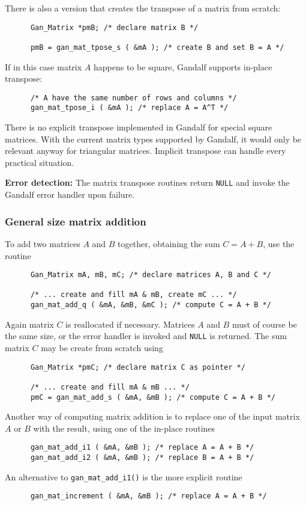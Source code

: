 There is also a version that creates the transpose of a matrix from scratch:
\begin{verbatim}
      Gan_Matrix *pmB; /* declare matrix B */

      pmB = gan_mat_tpose_s ( &mA ); /* create B and set B = A */
\end{verbatim}
If in this case matrix $A$ happens to be square, Gandalf supports in-place
transpose:
\begin{verbatim}
      /* A have the same number of rows and columns */
      gan_mat_tpose_i ( &mA ); /* replace A = A^T */
\end{verbatim}

There is no explicit transpose implemented in Gandalf for special square
matrices. With the current matrix types supported by Gandalf, it would only
be relevant anyway for triangular matrices. Implicit transpose can handle
every practical situation.

{\bf Error detection:} The matrix transpose routines return {\tt NULL} and
invoke the Gandalf error handler upon failure.

\subsubsection{General size matrix addition}
To add two matrices $A$ and $B$ together, obtaining the sum
$C = A + B$, use the routine
\begin{verbatim}
      Gan_Matrix mA, mB, mC; /* declare matrices A, B and C */

      /* ... create and fill mA & mB, create mC ... */
      gan_mat_add_q ( &mA, &mB, &mC ); /* compute C = A + B */
\end{verbatim}
Again matrix $C$ is reallocated if necessary. Matrices $A$ and
$B$ must of course be the same size, or the error handler is invoked
and {\tt NULL} is returned. The sum matrix $C$ may be create from scratch
using
\begin{verbatim}
      Gan_Matrix *pmC; /* declare matrix C as pointer */

      /* ... create and fill mA & mB ... */
      pmC = gan_mat_add_s ( &mA, &mB ); /* compute C = A + B */
\end{verbatim}
Another way of computing matrix addition is to replace one of the input
matrix $A$ or $B$ with the result, using one of the in-place routines
\begin{verbatim}
      gan_mat_add_i1 ( &mA, &mB ); /* replace A = A + B */
      gan_mat_add_i2 ( &mA, &mB ); /* replace B = A + B */
\end{verbatim}
An alternative to {\tt gan\_mat\_add\_i1()} is the more explicit routine
\begin{verbatim}
      gan_mat_increment ( &mA, &mB ); /* replace A = A + B */
\end{verbatim}

